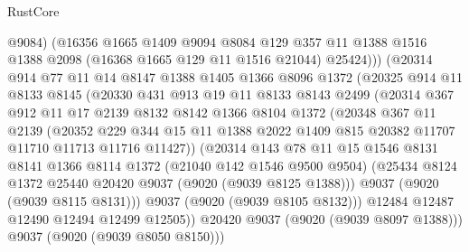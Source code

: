 \begin{lexlean}{RustCore}
\begin{coremodule}
                  @9084)
                (@16356
                  @1665
                  @1409
                  @9094
                  @8084
                  @129
                  @357
                  @11
                  @1388
                  @1516
                  @1388
                  @2098
                  (@16368 @1665 @129 @11 @1516 @21044)
                  @25424)))
            (@20314
              @914
              @77
              @11
              @14
              @8147
              @1388
              @1405
              @1366
              @8096
              @1372
              (@20325
                @914
                @11
                @8133
                @8145
                (@20330
                  @431
                  @913
                  @19
                  @11
                  @8133
                  @8143
                  @2499
                  (@20314
                    @367
                    @912
                    @11
                    @17
                    @2139
                    @8132
                    @8142
                    @1366
                    @8104
                    @1372
                    (@20348
                      @367
                      @11
                      @2139
                      (@20352
                        @229
                        @344
                        @15
                        @11
                        @1388
                        @2022
                        @1409
                        @815
                        @20382
                        @11707
                        @11710
                        @11713
                        @11716
                        @11427))
                    (@20314
                      @143
                      @78
                      @11
                      @15
                      @1546
                      @8131
                      @8141
                      @1366
                      @8114
                      @1372
                      (@21040 @142 @1546 @9500 @9504)
                      (@25434 @8124 @1372 @25440 @20420 @9037 (@9020 (@9039 @8125 @1388)))
                      @9037
                      (@9020 (@9039 @8115 @8131)))
                    @9037
                    (@9020 (@9039 @8105 @8132)))
                  @12484
                  @12487
                  @12490
                  @12494
                  @12499
                  @12505))
              @20420
              @9037
              (@9020 (@9039 @8097 @1388)))
            @9037
            (@9020 (@9039 @8050 @8150)))

\end{coremodule}
\end{lexlean}
